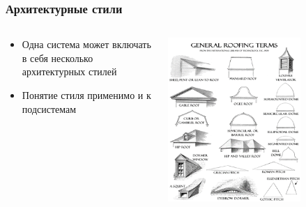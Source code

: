 \documentclass{../../slides-style}
\begin{document}
    \begin{frame}
        \frametitle{Архитектурные стили}
        \begin{columns}
            \begin{column}{0.5\textwidth}
                \begin{itemize}
                    \item Одна система может включать в себя несколько архитектурных стилей
                    \item Понятие стиля применимо и к подсистемам
                \end{itemize}
            \end{column}
            \begin{column}{0.5\textwidth}
                \begin{center}
                    \includegraphics[width=0.7\textwidth]{roofStyles.png}
                \end{center}
            \end{column}
        \end{columns}
    \end{frame}
\end{document}
